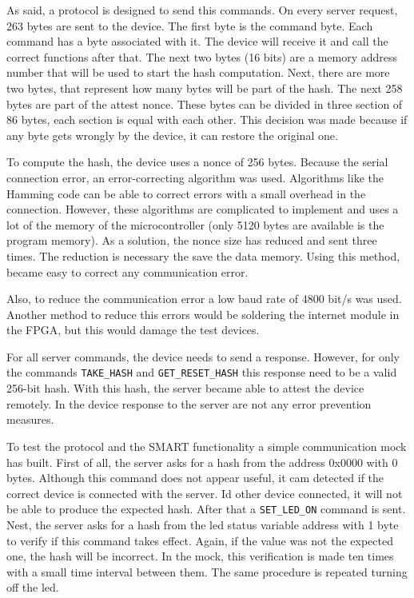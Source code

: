 As said, a protocol is designed to send this commands. On every server request, 263 bytes are sent to the device. The first byte is the command byte. Each command has a byte associated with it. The device will receive it and call the correct functions after that. The next two bytes (16 bits) are a memory address number that will be used to start the hash computation. Next, there are more two bytes, that represent how many bytes will be part of the hash. The next 258 bytes are part of the attest nonce. These bytes can be divided in three section of 86 bytes, each section is equal with each other. This decision was made because if any byte gets wrongly by the device, it can restore the original one. 

To compute the hash, the device uses a nonce of  256 bytes.  Because the serial connection error, an error-correcting algorithm was used.  Algorithms like the Hamming code can be able to correct errors with a small overhead in the connection. However, these algorithms are complicated to implement and uses a lot of the memory of the microcontroller (only 5120 bytes are available is the program memory). As a solution, the nonce size has reduced and sent three times. The reduction is necessary the save the data memory. Using this method, became easy to correct any communication error. 

Also, to reduce the communication error a low baud rate of 4800 bit/s was used. Another method to reduce this errors would be soldering the internet module in the FPGA, but this would damage the test devices.

For all server commands, the device needs to send a response. However, for only the commands \verb|TAKE_HASH| and \verb|GET_RESET_HASH| this response need to be a valid 256-bit hash. With this hash, the server became able to attest the device remotely.  In the device response to the server are not any error prevention measures.

To test the protocol and the SMART functionality a simple communication mock has built. First of all, the server asks for a hash from the address 0x0000 with 0 bytes. Although this command does not appear useful, it cam detected if the correct device is connected with the server. Id other device connected, it will not be able to produce the expected hash. After that a \verb|SET_LED_ON| command is sent. Nest, the server asks for a hash from the led status variable address with 1 byte to verify if this command takes effect. Again, if the value was not the expected one, the hash will be incorrect. In the mock, this verification is made ten times with a small time interval between them. The same procedure is repeated turning off the led.

